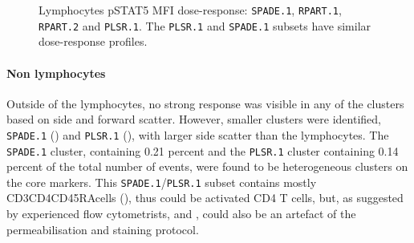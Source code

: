 \begin{figure}
\begin{minipage}{.5\textwidth}
\end{minipage}
\begin{minipage}{.3\textwidth}
{ Lymphocytes pSTAT5 MFI dose-response: \texttt{SPADE.1}, \texttt{RPART.1}, \texttt{RPART.2} and \texttt{PLSR.1}. }
{
    The \texttt{PLSR.1} and \texttt{SPADE.1} subsets have similar dose-response profiles.
}
\end{minipage}
\end{figure}




\clearpage


\paragraph{Non lymphocytes}
Outside of the lymphocytes, no strong response was visible in any of the clusters based on side and forward scatter.
However, smaller clusters were identified, \texttt{SPADE.1} () and \texttt{PLSR.1} (), with larger side scatter than the lymphocytes.
The \texttt{SPADE.1} cluster, containing 0.21 percent and the \texttt{PLSR.1} cluster containing 0.14 percent of the total number of events, were found to be heterogeneous clusters on the core markers.
This \texttt{SPADE.1}/\texttt{PLSR.1} subset contains mostly CD3\positive CD4\positive CD45RA\positive cells (), thus could be activated CD4 T cells, but, as suggested by experienced flow cytometrists,  and , could also be an artefact of the permeabilisation and staining protocol.


